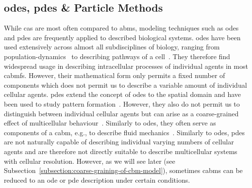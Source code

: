 %

\subsection{\acsp{ode}, \acsp{pde} \& Particle Methods}
While \acp{ca} are most often compared to \acp{abm}, modeling techniques such as \acp{ode} and
\acp{pde} are frequently applied to described biological systems.
\acp{ode} have been used extensively across almost all subdisciplines of biology, ranging from
population-dynamics~\cite{Lotka1925,VOLTERRA1926} to describing pathways of a
cell~\cite{Swameye2003}.
They therefore find widespread usage in describing intracellular processes of individual agents
in most \acp{cabmf}.
However, their mathematical form only permits a fixed number of components which does not permit us
to describe a variable amount of individual cellular agents.
\acp{pde} extend the concept of \acp{ode} to the spatial domain and have been used to study pattern
formation~\cite{Turing1952,Gierer1972,Meinhardt2008}.
However, they also do not permit us to distinguish between individual cellular agents but can arise
as a coarse-grained effect of multicellular behaviour~\cite{Erban2004}.
Similarly to \acp{ode}, they often serve as components of a \ac{cabm}, e.g., to describe fluid
mechanics~\cite{Navier1827,Stokes1845}.
Similarly to \acp{ode}, \acp{pde} are not naturally capable of describing individual varying numbers
of cellular agents and are therefore not directly suitable to describe multicellular systems with
cellular resolution.
However, as we will see later (see Subsection~\ref{subsection:coarse-graining-of-cbm-model}),
sometimes \acp{cabm} can be reduced to an \ac{ode} or \ac{pde} description under certain conditions.

